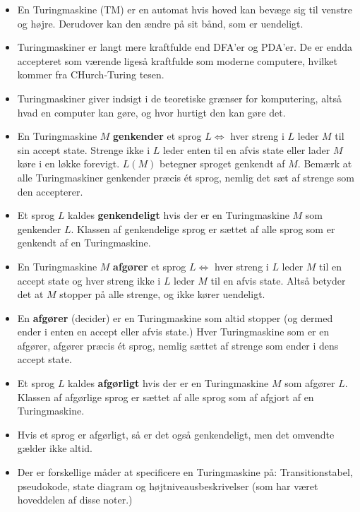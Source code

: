 \begin{itemize}
  \item En Turingmaskine (TM) er en automat hvis hoved kan bevæge sig til venstre og højre. Derudover kan den ændre på sit bånd, som er uendeligt.
  \item Turingmaskiner er langt mere kraftfulde end DFA'er og PDA'er. De er endda accepteret som værende ligeså kraftfulde som moderne computere, hvilket kommer fra CHurch-Turing tesen.
  \item Turingmaskiner giver indsigt i de teoretiske grænser for komputering, altså hvad en computer kan gøre, og hvor hurtigt den kan gøre det.
  \item En Turingmaskine $M$ \textbf{genkender} et sprog $L \iff$ hver streng i $L$ leder $M$ til sin accept state. Strenge ikke i $L$ leder enten til en afvis state eller lader $M$ køre i en løkke forevigt. $L(M)$ betegner sproget genkendt af $M$. Bemærk at alle Turingmaskiner genkender præcis ét sprog, nemlig det sæt af strenge som den accepterer.
  \item Et sprog $L$ kaldes \textbf{genkendeligt} hvis der er en Turingmaskine $M$ som genkender $L$. Klassen af genkendelige sprog er sættet af alle sprog som er genkendt af en Turingmaskine.
  \item En Turingmaskine $M$ \textbf{afgører} et sprog $L \iff$ hver streng i $L$ leder $M$ til en accept state og hver streng ikke i $L$ leder $M$ til en afvis state. Altså betyder det at $M$ stopper på alle strenge, og ikke kører uendeligt.
  \item En \textbf{afgører} (decider) er en Turingmaskine som altid stopper (og dermed ender i enten en accept eller afvis state.) Hver Turingmaskine som er en afgører, afgører præcis ét sprog, nemlig sættet af strenge som ender i dens accept state.
  \item Et sprog $L$ kaldes \textbf{afgørligt} hvis der er en Turingmaskine $M$ som afgører $L$. Klassen af afgørlige sprog er sættet af alle sprog som af afgjort af en Turingmaskine.
  \item Hvis et sprog er afgørligt, så er det også genkendeligt, men det omvendte gælder ikke altid.
  \item Der er forskellige måder at specificere en Turingmaskine på: Transitionstabel, pseudokode, state diagram og højtniveausbeskrivelser (som har været hoveddelen af disse noter.)
\end{itemize}











